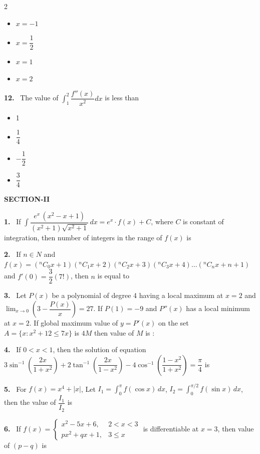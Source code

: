 \documentclass[10pt]{extarticle}
\newcommand{\sect}[1]{\par\smallskip\noindent\textbf{#1}\par}
\newcommand{\qn}[1]{\par\smallskip\noindent\textbf{#1.}~}
\newenvironment{qoptions}{\begin{itemize}[leftmargin=1.8em,itemsep=1pt,topsep=2pt,label={}]}{\end{itemize}}
\newcommand{\opt}[2]{\item[(#1)] #2}
\begin{document}
\begin{multicols}{2}
\begin{qoptions}
\opt{A}{$x=-1$}
\opt{B}{$x=\dfrac12$}
\opt{C}{$x=1$}
\opt{D}{$x=2$}
\end{qoptions}
\qn{12} The value of $\displaystyle\int_1^2\dfrac{f''(x)}{x^2}dx$ is less than
\begin{qoptions}
\opt{A}{1}
\opt{B}{$\dfrac14$}
\opt{C}{$-\dfrac12$}
\opt{D}{$\dfrac34$}
\end{qoptions}
\sect{SECTION-II}
\qn{1} If $\displaystyle\int\dfrac{e^x\,(x^2-x+1)}{(x^2+1)\sqrt{x^2+1}}\,dx=e^x\cdot f(x)+C$, where $C$ is constant of integration, then number of integers in the range of $f(x)$ is
\qn{2} If $n\in N$ and $f(x)=({}^nC_0x+1)({}^nC_1x+2)({}^nC_2x+3)({}^nC_3x+4)\dots({}^nC_nx+n+1)$ and $f'(0)=\dfrac32(7!)$, then $n$ is equal to
\qn{3} Let $P(x)$ be a polynomial of degree 4 having a local maximum at $x=2$ and $\displaystyle\lim_{x\to0}\left(3-\dfrac{P(x)}{x}\right)=27$. If $P(1)=-9$ and $P''(x)$ has a local minimum at $x=2$. If global maximum value of $y=P'(x)$ on the set $A=\{x:x^2+12\le7x\}$ is $4M$ then value of $M$ is :
\qn{4} If $0<x<1$, then the solution of equation $3\sin^{-1}\!\left(\dfrac{2x}{1+x^2}\right)+2\tan^{-1}\!\left(\dfrac{2x}{1-x^2}\right)-4\cos^{-1}\!\left(\dfrac{1-x^2}{1+x^2}\right)=\dfrac\pi4$ is
\qn{5} For $f(x)=x^4+|x|$, Let $I_1=\displaystyle\int_0^\pi f(\cos x)\,dx$, $I_2=\int_0^{\pi/2}f(\sin x)\,dx$, then the value of $\dfrac{I_1}{I_2}$ is
\qn{6} If $f(x)=\begin{cases}x^2-5x+6, & 2<x<3\\ px^2+qx+1, & 3\le x\end{cases}$ is differentiable at $x=3$, then value of $(p-q)$ is
\end{multicols}
\end{document}
